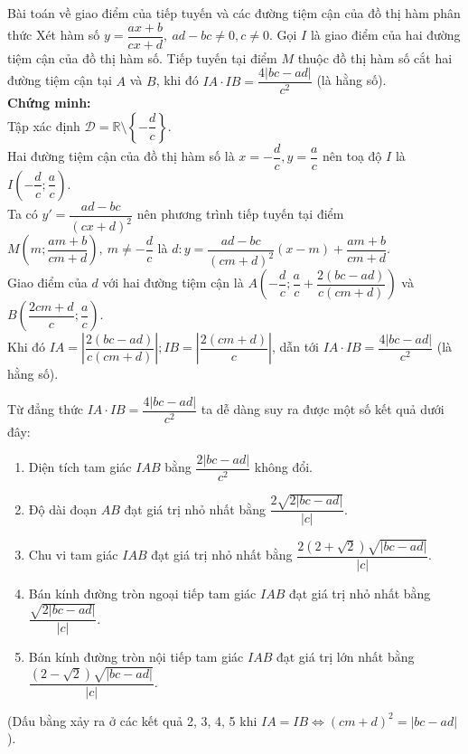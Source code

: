 \begin{dang}{Bài toán về giao điểm của tiếp tuyến và các đường tiệm cận của đồ thị hàm phân thức}
	Xét hàm số $y=\dfrac{ax+b}{cx+d},\ ad-bc\ne 0, c\ne 0$. Gọi $I$ là giao điểm của hai đường tiệm cận của đồ thị hàm số. Tiếp tuyến tại điểm $M$ thuộc đồ thị hàm số cắt hai đường tiệm cận tại $A$ và $B$, khi đó $IA\cdot IB=\dfrac{4|bc-ad|}{c^2}$ (là hằng số).\\
	\textbf{Chứng minh:}\\
	Tập xác định $\mathscr {D}= \mathbb{R}\setminus \left\{-\dfrac{d}{c}\right\}$.\\
	Hai đường tiệm cận của đồ thị hàm số là $x=-\dfrac{d}{c},y=\dfrac{a}{c}$ nên toạ độ $I$ là $I\left(-\dfrac{d}{c};\dfrac{a}{c}\right)$.\\
	Ta có $y'=\dfrac{ad-bc}{(cx+d)^2}$ nên phương trình tiếp tuyến tại điểm $M\left(m;\dfrac{am+b}{cm+d}\right),\ m\ne -\dfrac{d}{c}$ là $d\colon y=\dfrac{ad-bc}{(cm+d)^2}(x-m)+\dfrac{am+b}{cm+d}$.\\
	Giao điểm của $d$ với hai đường tiệm cận là $A\left(-\dfrac{d}{c};\dfrac{a}{c}+\dfrac{2(bc-ad)}{c(cm+d)}\right)$ và $B\left(\dfrac{2cm+d}{c};\dfrac{a}{c}\right)$.\\
	Khi đó $IA=\left|\dfrac{2(bc-ad)}{c(cm+d)}\right|; IB=\left|\dfrac{2(cm+d)}{c}\right|$, dẫn tới $IA\cdot IB=\dfrac{4|bc-ad|}{c^2}$ (là hằng số).\\
	\begin{note}
		Từ đẳng thức $IA\cdot IB=\dfrac{4|bc-ad|}{c^2}$ ta dễ dàng suy ra được một số kết quả dưới đây:
		\begin{enumerate}
			\item Diện tích tam giác $IAB$ bằng $\dfrac{2|bc-ad|}{c^2}$ không đổi.
			\item Độ dài đoạn $AB$ đạt giá trị nhỏ nhất bằng $\dfrac{2\sqrt{2|bc-ad|}}{|c|}$.
			\item Chu vi tam giác $IAB$ đạt giá trị nhỏ nhất bằng $\dfrac{2(2+\sqrt{2})\sqrt{|bc-ad|}}{|c|}$.			
			\item Bán kính đường tròn ngoại tiếp tam giác $IAB$ đạt giá trị nhỏ nhất bằng $\dfrac{\sqrt{2|bc-ad|}}{|c|}$.		
			\item Bán kính đường tròn nội tiếp tam giác $IAB$ đạt giá trị lớn nhất bằng  $\dfrac{(2-\sqrt{2})\sqrt{|bc-ad|}}{|c|}$.		
		\end{enumerate}
		(Dấu bằng xảy ra ở các kết quả 2, 3, 4, 5 khi $IA=IB\Leftrightarrow (cm+d)^2=|bc-ad|$).
	\end{note}
\end{dang}

